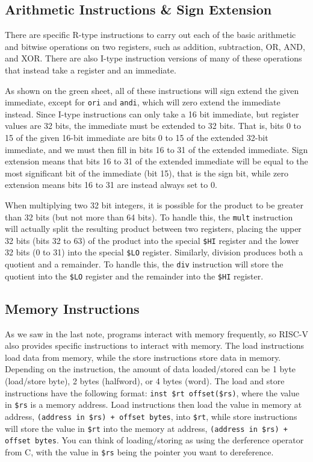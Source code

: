 \documentclass{article}
\begin{document}
\subsection{Arithmetic Instructions \& Sign Extension}
There are specific R-type instructions to carry out each of the basic arithmetic and bitwise operations on two registers, such as addition, subtraction, OR, AND, and XOR. There are also I-type instruction versions of many of these operations that instead take a register and an immediate. 

As shown on the green sheet, all of these instructions will sign extend the given immediate, except for \texttt{ori} and \texttt{andi}, which will zero extend the immediate instead. Since I-type instructions can only take a 16 bit immediate, but register values are 32 bits, the immediate must be extended to 32 bits. That is, bits 0 to 15 of the given 16-bit immediate are bits 0 to 15 of the extended 32-bit immediate, and we must then fill in bits 16 to 31 of the extended immediate. Sign extension means that bits 16 to 31 of the extended immediate will be equal to the most significant bit of the immediate (bit 15), that is the sign bit, while zero extension means bits 16 to 31 are instead always set to 0.

When multiplying two 32 bit integers, it is possible for the product to be greater than 32 bits (but not more than 64 bits). To handle this, the \texttt{mult} instruction will actually split the resulting product between two registers, placing the upper 32 bits (bits 32 to 63) of the product into the special \texttt{\$HI} register and the lower 32 bits (0 to 31) into the special \texttt{\$LO} register. Similarly, division produces both a quotient and a remainder. To handle this, the \texttt{div} instruction will store the quotient into the \texttt{\$LO} register and the remainder into the \texttt{\$HI} register.

\subsection{Memory Instructions}
As we saw in the last note, programs interact with memory frequently, so RISC-V also provides specific instructions to interact with memory. The load instructions load data from memory, while the store instructions store data in memory. Depending on the instruction, the amount of data loaded/stored can be 1 byte (load/store byte), 2 bytes (halfword), or 4 bytes (word). The load and store instructions have the following format: \texttt{inst \$rt offset(\$rs)}, where the value in \texttt{\$rs} is a memory address. Load instructions then load the value in memory at address, \texttt{(address in \$rs) + offset bytes}, into \texttt{\$rt}, while store instructions will store the value in \texttt{\$rt} into the memory at address, \texttt{(address in \$rs) + offset bytes}. You can think of loading/storing as using the derference operator from C, with the value in \texttt{\$rs} being the pointer you want to dereference.
\end{document}
